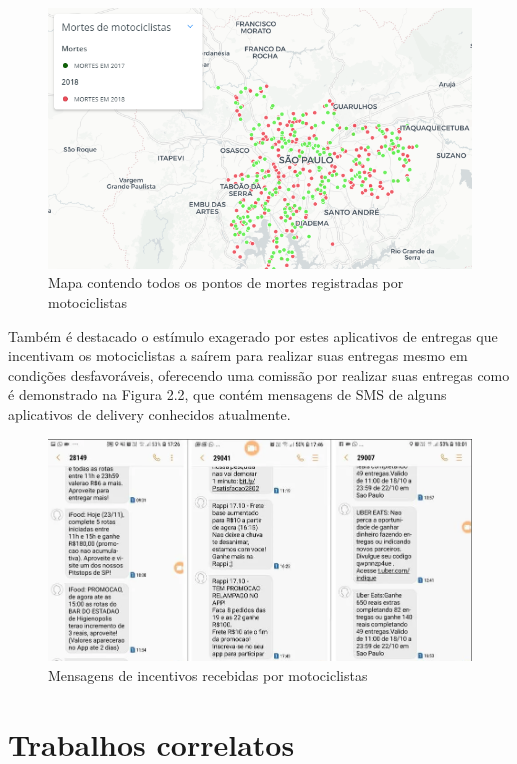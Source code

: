 \begin{figure}[H]

 \caption{Mapa contendo todos os pontos de mortes registradas por motociclistas}
  \includegraphics[width=\textwidth]{images/Cap2/mapa.png}
  
  
\end{figure}


Também é destacado o estímulo exagerado por estes aplicativos de entregas que incentivam os motociclistas a saírem para realizar suas entregas mesmo em condições desfavoráveis, oferecendo uma comissão por realizar suas entregas como é demonstrado na Figura 2.2, que contém mensagens de SMS de alguns aplicativos de delivery conhecidos atualmente.


\begin{figure}[H]

 \caption{Mensagens de incentivos recebidas por motociclistas}
  \includegraphics[width=\textwidth]{images/Cap2/whtas.png}
  
\end{figure}


\section{Trabalhos correlatos}

